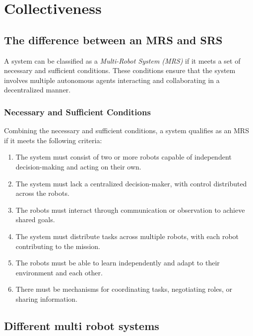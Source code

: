 \chapter{Collectiveness}



\section{The difference between an MRS and SRS}
    A system can be classified as a \textit{Multi-Robot System (MRS)} if it meets a set of necessary and sufficient conditions. These conditions ensure that the system involves multiple autonomous agents interacting and collaborating in a decentralized manner.
    
    \subsection{Necessary and Sufficient Conditions}
    Combining the necessary and sufficient conditions, a system qualifies as an MRS if it meets the following criteria:
    
    \begin{enumerate}
        \item The system must consist of two or more robots capable of independent decision-making and acting on their own. \cite{brambilla-2013-swarm-robotics-review}
        \item The system must lack a centralized decision-maker, with control distributed across the robots. \cite{fong-2003-socially-interactive-robots-survey}
        \item The robots must interact through communication or observation to achieve shared goals. \cite{laird-2012-soar-cognitive-architecture}
        \item The system must distribute tasks across multiple robots, with each robot contributing to the mission. \cite{tenorth-2013-knowrob-knowledge-processing-infrastructure}
        \item The robots must be able to learn independently and adapt to their environment and each other. \cite{hawkins-2004-on-intelligence}
        \item There must be mechanisms for coordinating tasks, negotiating roles, or sharing information. \cite{graves-2014-neural-turing-machines}
    \end{enumerate}

\section{Different multi robot systems}
    
